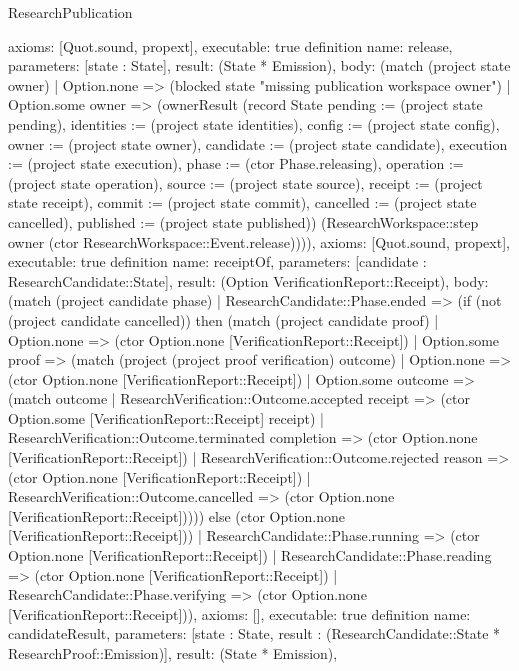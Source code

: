 \begin{lexlean}{ResearchPublication}
\begin{semanticmodule}
{ axioms: [Quot.sound, propext],
 executable: true
}
definition{
 name: release,
 parameters: [state : State],
 result: (State * Emission),
 body: (match (project state owner) | Option.none => (blocked state "missing publication workspace owner") | Option.some owner => (ownerResult (record State {pending := (project state pending), identities := (project state identities), config := (project state config), owner := (project state owner), candidate := (project state candidate), execution := (project state execution), phase := (ctor Phase.releasing), operation := (project state operation), source := (project state source), receipt := (project state receipt), commit := (project state commit), cancelled := (project state cancelled), published := (project state published)}) (ResearchWorkspace::step owner (ctor ResearchWorkspace::Event.release)))),
 axioms: [Quot.sound, propext],
 executable: true
}
definition{
 name: receiptOf,
 parameters: [candidate : ResearchCandidate::State],
 result: (Option VerificationReport::Receipt),
 body: (match (project candidate phase) | ResearchCandidate::Phase.ended => (if (not (project candidate cancelled)) then (match (project candidate proof) | Option.none => (ctor Option.none [VerificationReport::Receipt]) | Option.some proof => (match (project (project proof verification) outcome) | Option.none => (ctor Option.none [VerificationReport::Receipt]) | Option.some outcome => (match outcome | ResearchVerification::Outcome.accepted receipt => (ctor Option.some [VerificationReport::Receipt] receipt) | ResearchVerification::Outcome.terminated completion => (ctor Option.none [VerificationReport::Receipt]) | ResearchVerification::Outcome.rejected reason => (ctor Option.none [VerificationReport::Receipt]) | ResearchVerification::Outcome.cancelled => (ctor Option.none [VerificationReport::Receipt])))) else (ctor Option.none [VerificationReport::Receipt])) | ResearchCandidate::Phase.running => (ctor Option.none [VerificationReport::Receipt]) | ResearchCandidate::Phase.reading => (ctor Option.none [VerificationReport::Receipt]) | ResearchCandidate::Phase.verifying => (ctor Option.none [VerificationReport::Receipt])),
 axioms: [],
 executable: true
}
definition{
 name: candidateResult,
 parameters: [state : State, result : (ResearchCandidate::State * ResearchProof::Emission)],
 result: (State * Emission),
}
\end{semanticmodule}
\end{lexlean}
